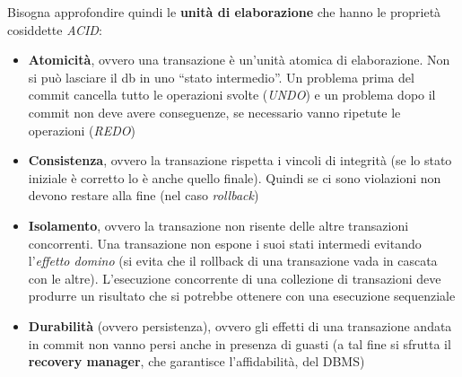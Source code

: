 \documentclass[a4paper,12pt, oneside]{book}
\begin{document}
Bisogna approfondire quindi le \textbf{unità di elaborazione} che hanno le
proprietà cosiddette \textit{ACID}:
\begin{itemize}
  \item \textbf{Atomicità}, ovvero una transazione è un'unità atomica di
  elaborazione. Non si può lasciare il db in uno ``stato 
  intermedio''. Un problema prima del commit cancella tutto le operazioni svolte
  (\textit{UNDO}) e un problema dopo il commit non deve avere conseguenze, se
  necessario vanno ripetute le operazioni (\textit{REDO}) 
  \item \textbf{Consistenza}, ovvero la transazione rispetta i vincoli di
  integrità (se lo stato iniziale è corretto lo è anche quello finale). Quindi
  se ci sono violazioni non devono restare alla fine (nel caso
  \textit{rollback})
  \item \textbf{Isolamento}, ovvero la transazione non risente delle altre
  transazioni concorrenti. Una transazione non espone i suoi stati intermedi
  evitando l'\textit{effetto domino} (si evita che il rollback di una
  transazione vada in cascata con le altre). L'esecuzione concorrente di una
  collezione di transazioni deve produrre un risultato che si potrebbe ottenere
  con una esecuzione sequenziale
  \item \textbf{Durabilità} (ovvero persistenza), ovvero gli effetti di una
  transazione andata in commit non vanno persi anche in presenza di guasti (a
  tal fine si sfrutta il \textbf{recovery manager}, che garantisce
  l'affidabilità, del DBMS)
\end{itemize}
\end{document}
